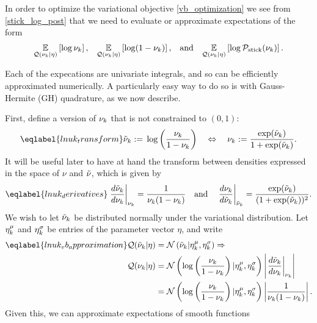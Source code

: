 In order to optimize the variational objective \eqref{vb_optimization} we see
from \eqref{stick_log_post} that we need to evaluate or approximate expectations
of the form
%
\begin{align*}
%
\expect{\q(\nuk \vert \eta)}{\log \nuk}
\textrm{,}\quad
\expect{\q(\nuk \vert \eta)}{\log (1 - \nuk)}
\textrm{,}\quad\textrm{and}\quad
\expect{\q(\nuk \vert \eta)}{\log \pstick(\nuk)}.
%
\end{align*}

Each of the expecations are univariate integrals, and so can be efficiently
approximated numerically.  A particularly easy way to do so is with
Gauss-Hermite (GH) quadrature, as we now describe.

First, define a version of $\nu_{k}$ that is not constrained to $(0,1)$:
%
\begin{align}\eqlabel{lnuk_transform}
%
\lnuk :={} \log \left( \frac{\nuk}{1 - \nuk} \right)
\quad\Leftrightarrow\quad
\nuk :={} \frac{\exp(\lnuk)}{1 + \exp(\lnuk)}.
%
\end{align}
%
It will be useful later to have at hand the transform between densities
expressed in the space of $\nu$ and $\tilde{\nu}$, which is given by
%
\begin{align}\eqlabel{lnuk_derivatives}
%
\fracat{d \lnu_\k}{ d\nuk}{\nuk} ={}
    \frac{1}{\nuk (1 - \nuk)} \mathand
%
\fracat{d \nuk}{ d\lnuk}{\lnuk} ={}
    \frac{\exp(\lnuk)}{(1 + \exp(\lnuk))^2}.
%
\end{align}
%
We wish to let $\tilde{\nu}_k$ be distributed normally under the variational
distribution.  Let $\eta^{\mu}_k$ and $\eta^{\sigma}_k$ be entries of the parameter
vector $\eta$, and write
%
\begin{align}\eqlabel{lnuk_vb_approximation}
%
\q(\lnu_\k \vert \eta) ={}& \normdist{\lnu_\k \vert \lnumean_\k, \lnusd_\k}
\Rightarrow \\
\q(\nuk \vert \eta) ={}&
    \normdist{\log \left( \frac{\nuk}{1 - \nuk} \right)
        \vert \lnumean_\k, \lnusd_\k}
    \left|\fracat{d \lnu_\k}{ d\nuk}{\nuk}\right|
\nonumber\\={}&
\normdist{\log \left( \frac{\nuk}{1 - \nuk} \right)
        \vert \lnumean_\k, \lnusd_\k}
    \left|\frac{1}{\nuk (1 - \nuk)}\right|.
\nonumber
%
\end{align}
%
Given this, we can approximate expectations of smooth functions
